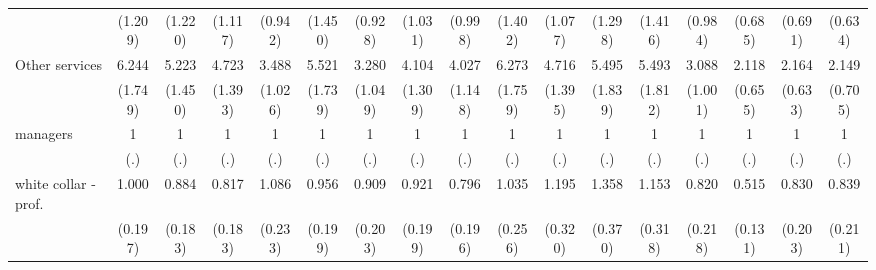 {\begin{tabular}{l*{16}{c}}
                    &     (1.209)         &     (1.220)         &     (1.117)         &     (0.942)         &     (1.450)         &     (0.928)         &     (1.031)         &     (0.998)         &     (1.402)         &     (1.077)         &     (1.298)         &     (1.416)         &     (0.984)         &     (0.685)         &     (0.691)         &     (0.634)         \\
[1em]
Other services      &       6.244\sym{***}&       5.223\sym{***}&       4.723\sym{***}&       3.488\sym{***}&       5.521\sym{***}&       3.280\sym{***}&       4.104\sym{***}&       4.027\sym{***}&       6.273\sym{***}&       4.716\sym{***}&       5.495\sym{***}&       5.493\sym{***}&       3.088\sym{***}&       2.118\sym{*}  &       2.164\sym{**} &       2.149\sym{*}  \\
                    &     (1.749)         &     (1.450)         &     (1.393)         &     (1.026)         &     (1.739)         &     (1.049)         &     (1.309)         &     (1.148)         &     (1.759)         &     (1.395)         &     (1.839)         &     (1.812)         &     (1.001)         &     (0.655)         &     (0.633)         &     (0.705)         \\
[1em]
managers            &           1         &           1         &           1         &           1         &           1         &           1         &           1         &           1         &           1         &           1         &           1         &           1         &           1         &           1         &           1         &           1         \\
                    &         (.)         &         (.)         &         (.)         &         (.)         &         (.)         &         (.)         &         (.)         &         (.)         &         (.)         &         (.)         &         (.)         &         (.)         &         (.)         &         (.)         &         (.)         &         (.)         \\
[1em]
white collar - prof.&       1.000         &       0.884         &       0.817         &       1.086         &       0.956         &       0.909         &       0.921         &       0.796         &       1.035         &       1.195         &       1.358         &       1.153         &       0.820         &       0.515\sym{**} &       0.830         &       0.839         \\
                    &     (0.197)         &     (0.183)         &     (0.183)         &     (0.233)         &     (0.199)         &     (0.203)         &     (0.199)         &     (0.196)         &     (0.256)         &     (0.320)         &     (0.370)         &     (0.318)         &     (0.218)         &     (0.131)         &     (0.203)         &     (0.211)         \\

\end{tabular}}
